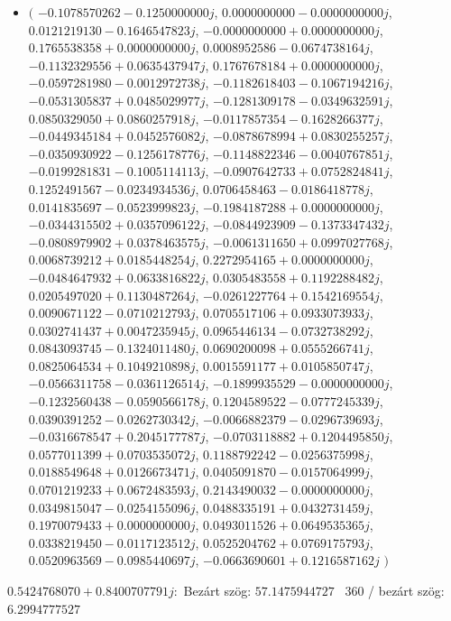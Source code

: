 \documentclass[14pt,a4paper]{article}
\begin{document}
\begin{itemize}
\item
$\big($
$-0.1078570262-0.1250000000j$, $0.0000000000-0.0000000000j$, $0.0121219130-0.1646547823j$, $-0.0000000000+0.0000000000j$, $0.1765538358+0.0000000000j$, $0.0008952586-0.0674738164j$, $-0.1132329556+0.0635437947j$, $0.1767678184+0.0000000000j$, $-0.0597281980-0.0012972738j$, $-0.1182618403-0.1067194216j$, $-0.0531305837+0.0485029977j$, $-0.1281309178-0.0349632591j$, $0.0850329050+0.0860257918j$, $-0.0117857354-0.1628266377j$, $-0.0449345184+0.0452576082j$, $-0.0878678994+0.0830255257j$, $-0.0350930922-0.1256178776j$, $-0.1148822346-0.0040767851j$, $-0.0199281831-0.1005114113j$, $-0.0907642733+0.0752824841j$, $0.1252491567-0.0234934536j$, $0.0706458463-0.0186418778j$, $0.0141835697-0.0523999823j$, $-0.1984187288+0.0000000000j$, $-0.0344315502+0.0357096122j$, $-0.0844923909-0.1373347432j$, $-0.0808979902+0.0378463575j$, $-0.0061311650+0.0997027768j$, $0.0068739212+0.0185448254j$, $0.2272954165+0.0000000000j$, $-0.0484647932+0.0633816822j$, $0.0305483558+0.1192288482j$, $0.0205497020+0.1130487264j$, $-0.0261227764+0.1542169554j$, $0.0090671122-0.0710212793j$, $0.0705517106+0.0933073933j$, $0.0302741437+0.0047235945j$, $0.0965446134-0.0732738292j$, $0.0843093745-0.1324011480j$, $0.0690200098+0.0555266741j$, $0.0825064534+0.1049210898j$, $0.0015591177+0.0105850747j$, $-0.0566311758-0.0361126514j$, $-0.1899935529-0.0000000000j$, $-0.1232560438-0.0590566178j$, $0.1204589522-0.0777245339j$, $0.0390391252-0.0262730342j$, $-0.0066882379-0.0296739693j$, $-0.0316678547+0.2045177787j$, $-0.0703118882+0.1204495850j$, $0.0577011399+0.0703535072j$, $0.1188792242-0.0256375998j$, $0.0188549648+0.0126673471j$, $0.0405091870-0.0157064999j$, $0.0701219233+0.0672483593j$, $0.2143490032-0.0000000000j$, $0.0349815047-0.0254155096j$, $0.0488335191+0.0432731459j$, $0.1970079433+0.0000000000j$, $0.0493011526+0.0649535365j$, $0.0338219450-0.0117123512j$, $0.0525204762+0.0769175793j$, $0.0520963569-0.0985440697j$, $-0.0663690601+0.1216587162j$
$\big)$
\end{itemize}
$0.5424768070+0.8400707791j$:\
Bezárt szög: $57.1475944727$ \
360 / bezárt szög: $6.2994777527$\
\end{document}
